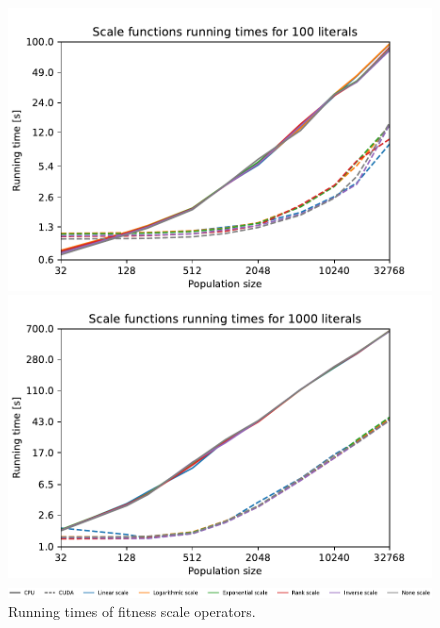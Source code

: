 \begin{figure}[ht!]
    \centering
    \begin{minipage}[t]{0.9\textwidth}
        \begin{minipage}[t]{0.48\textwidth}
            \includegraphics[width=\textwidth]{img/runs/time_ga_scale_100l.pdf}
        \end{minipage}
        \begin{minipage}[t]{0.48\textwidth}
            \includegraphics[width=\textwidth]{img/runs/time_ga_scale_1000l.pdf}
        \end{minipage}
    \end{minipage}

    \begin{minipage}[t]{0.9\textwidth}
        \includegraphics[width=\textwidth]{img/runs/time_ga_scale_legend.pdf}
    \end{minipage}

    \caption[Fitness scale operators running time]{Running times of fitness scale operators. }
\end{figure}



